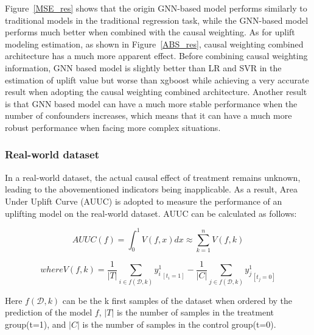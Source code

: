 \documentclass[sigconf,screen]{acmart}
\begin{document}
Figure~\ref{MSE_res} shows that the origin GNN-based model performs similarly to traditional models in the traditional regression task, while the GNN-based model performs much better when combined with the causal weighting. As for uplift modeling estimation, as shown in Figure~\ref{ABS_res}, causal weighting combined architecture has a much more apparent effect. Before combining causal weighting information, GNN based model is slightly better than LR and SVR in the estimation of uplift value but worse than xgboost while achieving a very accurate result when adopting the causal weighting combined architecture. Another result is that GNN based model can have a much more stable performance when the number of confounders increases, which means that it can have a much more robust performance when facing more complex situations.





\subsubsection{Real-world dataset}
In a real-world dataset, the actual causal effect of treatment remains unknown, leading to the abovementioned indicators being inapplicable. As a result, Area Under Uplift Curve (AUUC) is adopted  to measure the performance of an uplifting model on the real-world dataset. AUUC can be calculated as follows:

\begin{equation}
    AUUC(f)=\int_{0}^{1} V(f, x) d x \approx \sum_{k=1}^{n} V(f, k)
\end{equation}

\begin{equation}
    where V(f, k)=\frac{1}{|T|} \sum_{i \in f(\mathcal{D}, k)} {y_{i}^{1}}_{\left[t_{i}=1\right]} -\frac{1}{|C|} \sum_{j \in f(\mathcal{D}, k)} {y_{j}^{1}}_{\left[t_{j}=0\right]}
\end{equation}

Here $f(\mathcal{D}, k)$ can be the k first samples of the dataset when ordered by the prediction of the model $f$, $|T|$ is the number of samples in the treatment group(t=1), and $|C|$ is the number of samples in the control group(t=0).
\end{document}
